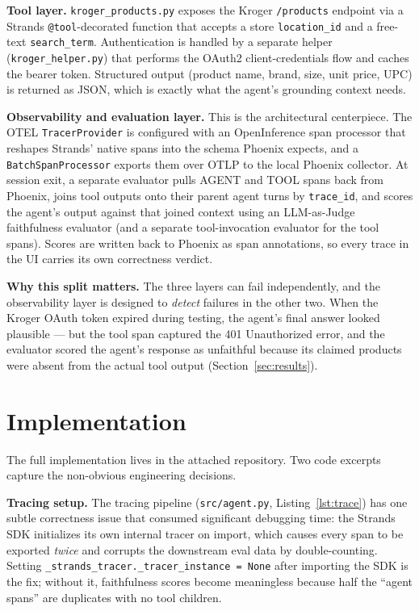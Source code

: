 \documentclass{article}
\begin{document}
\textbf{Tool layer.} \texttt{kroger\_products.py} exposes the Kroger \texttt{/products} endpoint via a Strands \texttt{@tool}-decorated function that accepts a store \texttt{location\_id} and a free-text \texttt{search\_term}. Authentication is handled by a separate helper (\texttt{kroger\_helper.py}) that performs the OAuth2 client-credentials flow and caches the bearer token. Structured output (product name, brand, size, unit price, UPC) is returned as JSON, which is exactly what the agent's grounding context needs.

\textbf{Observability and evaluation layer.} This is the architectural centerpiece. The OTEL \texttt{TracerProvider} is configured with an OpenInference span processor that reshapes Strands' native spans into the schema Phoenix expects, and a \texttt{BatchSpanProcessor} exports them over OTLP to the local Phoenix collector. At session exit, a separate evaluator pulls AGENT and TOOL spans back from Phoenix, joins tool outputs onto their parent agent turns by \texttt{trace\_id}, and scores the agent's output against that joined context using an LLM-as-Judge faithfulness evaluator (and a separate tool-invocation evaluator for the tool spans). Scores are written back to Phoenix as span annotations, so every trace in the UI carries its own correctness verdict.

\textbf{Why this split matters.} The three layers can fail independently, and the observability layer is designed to \emph{detect} failures in the other two. When the Kroger OAuth token expired during testing, the agent's final answer looked plausible --- but the tool span captured the 401 Unauthorized error, and the evaluator scored the agent's response as unfaithful because its claimed products were absent from the actual tool output (Section~\ref{sec:results}).

\FloatBarrier
\section{Implementation}

The full implementation lives in the attached repository. Two code excerpts capture the non-obvious engineering decisions.

\textbf{Tracing setup.} The tracing pipeline (\texttt{src/agent.py}, Listing~\ref{lst:trace}) has one subtle correctness issue that consumed significant debugging time: the Strands SDK initializes its own internal tracer on import, which causes every span to be exported \emph{twice} and corrupts the downstream eval data by double-counting. Setting \texttt{\_strands\_tracer.\_tracer\_instance = None} after importing the SDK is the fix; without it, faithfulness scores become meaningless because half the ``agent spans'' are duplicates with no tool children.
\end{document}
